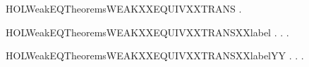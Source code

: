 \begin{SaveVerbatim}{HOLWeakEQTheoremsWEAKXXEQUIVXXTRANS}
\HOLTokenTurnstile{} \HOLSymConst{\HOLTokenForall{}}  .
          \HOLSymConst{\HOLTokenConj{}}    \HOLSymConst{\HOLTokenImp{}}   
\end{SaveVerbatim}
\newcommand{\HOLWeakEQTheoremsWEAKXXEQUIVXXTRANS}{\UseVerbatim{HOLWeakEQTheoremsWEAKXXEQUIVXXTRANS}}
\begin{SaveVerbatim}{HOLWeakEQTheoremsWEAKXXEQUIVXXTRANSXXlabel}
\HOLTokenTurnstile{} \HOLSymConst{\HOLTokenForall{}} .
          \HOLSymConst{\HOLTokenImp{}}
       \HOLSymConst{\HOLTokenForall{}} .
            \HOLTokenTransBegin{} \HOLTokenTransEnd {} \HOLSymConst{\HOLTokenImp{}}
           \HOLSymConst{\HOLTokenExists{}}.  \HOLTokenWeakTransBegin{} \HOLTokenWeakTransEnd {} \HOLSymConst{\HOLTokenConj{}}   
\end{SaveVerbatim}
\newcommand{\HOLWeakEQTheoremsWEAKXXEQUIVXXTRANSXXlabel}{\UseVerbatim{HOLWeakEQTheoremsWEAKXXEQUIVXXTRANSXXlabel}}
\begin{SaveVerbatim}{HOLWeakEQTheoremsWEAKXXEQUIVXXTRANSXXlabelYY}
\HOLTokenTurnstile{} \HOLSymConst{\HOLTokenForall{}} .
          \HOLSymConst{\HOLTokenImp{}}
       \HOLSymConst{\HOLTokenForall{}} .
            \HOLTokenTransBegin{} \HOLTokenTransEnd {} \HOLSymConst{\HOLTokenImp{}}
           \HOLSymConst{\HOLTokenExists{}}.  \HOLTokenWeakTransBegin{} \HOLTokenWeakTransEnd {} \HOLSymConst{\HOLTokenConj{}}   
\end{SaveVerbatim}
